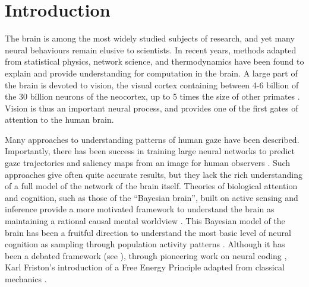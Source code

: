 \chapter*{Introduction}
The brain is among the most widely studied subjects of research, and yet many neural behaviours remain elusive to scientists. In recent years, methods adapted from statistical physics, network science, and thermodynamics have been found to explain and provide understanding for computation in the brain. A large part of the brain is devoted to vision, the visual cortex containing between 4-6 billion of the 30 billion neurons of the neocortex, up to 5 times the size of other primates \cite{wandell_visual_2009, andrews_correlated_1997}. Vision is thus an important neural process, and provides one of the first gates of attention to the human brain.

Many approaches to understanding patterns of human gaze have been described. Importantly, there has been success in training large neural networks to predict gaze trajectories \cite{bhandari_modeling_2025, wu_gitnet_2026,abdelrahman_deep_2026,bremer_predicting_2021,ozdel_gaze-guided_2024,akinyelu_convolutional_2022} and saliency maps from an image for human observers \cite{kummerer_modeling_2025,cornia_deep_2016, cornia_predicting_2018, kammerer2016deepgaze2, huang_salicon_2015, bujia_modeling_2022}. Such approaches give often quite accurate results, but they lack the rich understanding of a full model of the network of the brain itself. Theories of biological attention and cognition, such as those of the ``Bayesian brain'', built on active sensing and inference provide a more motivated framework to understand the brain as maintaining a rational causal mental worldview \cite{knill_bayesian_2004, costa_probabilistic_2024, bujia_modeling_2022, tan_theta_2024}. This Bayesian model of the brain has been a fruitful direction to understand the most basic level of neural cognition as sampling through population activity patterns \cite{orban_neural_2016, NIPS2002_a486cd07, beck_probabilistic_2008, zhu_autocorrelated_2024}. Although it has been a debated framework (see \cite{mangalam_myth_2025}), through pioneering work on neural coding \cite{Lange2023-sn, beck_probabilistic_2008}, Karl Friston's introduction of a Free Energy Principle adapted from classical mechanics \cite{Friston2010-aa, free}.